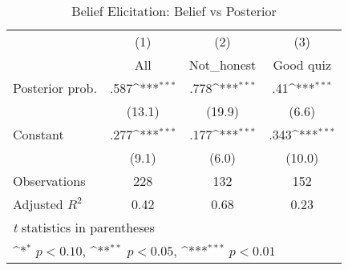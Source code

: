 \begin{table}[htbp]\centering
\def\sym#1{\ifmmode^{#1}\else\(^{#1}\)\fi}
\caption{Belief Elicitation: Belief vs Posterior}
\begin{tabular}{l*{3}{c}}
\hline\hline
                &\multicolumn{1}{c}{(1)}&\multicolumn{1}{c}{(2)}&\multicolumn{1}{c}{(3)}\\
                &\multicolumn{1}{c}{All}&\multicolumn{1}{c}{Not\_honest}&\multicolumn{1}{c}{Good quiz}\\
\hline
Posterior prob. &     .587\sym{***}&     .778\sym{***}&      .41\sym{***}\\
                &   (13.1)         &   (19.9)         &    (6.6)         \\
Constant        &     .277\sym{***}&     .177\sym{***}&     .343\sym{***}\\
                &    (9.1)         &    (6.0)         &   (10.0)         \\
\hline
Observations    &      228         &      132         &      152         \\
Adjusted \(R^{2}\)&     0.42         &     0.68         &     0.23         \\
\hline\hline
\multicolumn{4}{l}{\footnotesize \textit{t} statistics in parentheses}\\
\multicolumn{4}{l}{\footnotesize \sym{*} \(p<0.10\), \sym{**} \(p<0.05\), \sym{***} \(p<0.01\)}\\
\end{tabular}
\end{table}
